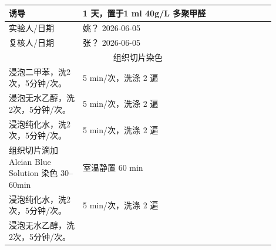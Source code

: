 \documentclass[UTF8,10pt,a4paper,fontset=fandol]{ctexart}
\newcommand{\fieldvalue}[1]{#1}
\newcommand{\handwritten}[1]{#1}
\begin{document}
\begin{tabular}{|p{0.25\linewidth}|p{0.65\linewidth}|}
\hline
诱导 &
\fieldvalue{\handwritten{1}} 天，置于1 ml 40g/L 多聚甲醛
\\ \hline
实验人/日期 &
\fieldvalue{\handwritten{姚？}}\quad
\fieldvalue{\handwritten{2026-06-05}}
\\ \hline
复核人/日期 &
\fieldvalue{\handwritten{张？}}\quad
\fieldvalue{\handwritten{2026-06-05}}
\\ \hline
\multicolumn{2}{|c|}{组织切片染色}\\ \hline
浸泡二甲苯，洗2次，5分钟/次。 &
\fieldvalue{\handwritten{5}} min/次，洗涤
\fieldvalue{\handwritten{2}} 遍
\\ \hline
浸泡无水乙醇，洗2次，5分钟/次。 &
\fieldvalue{\handwritten{5}} min/次，洗涤
\fieldvalue{\handwritten{2}} 遍
\\ \hline
浸泡纯化水，洗2次，5分钟/次。 &
\fieldvalue{\handwritten{5}} min/次，洗涤
\fieldvalue{\handwritten{2}} 遍
\\ \hline
组织切片滴加 Alcian Blue Solution 染色 30--60min &
室温静置
\fieldvalue{\handwritten{60}} min
\\ \hline
浸泡纯化水，洗2次，5分钟/次。 &
\fieldvalue{\handwritten{5}} min/次，洗涤
\fieldvalue{\handwritten{2}} 遍
\\ \hline
浸泡无水乙醇，洗2次，5分钟/次。 &

\end{tabular}
\end{document}

